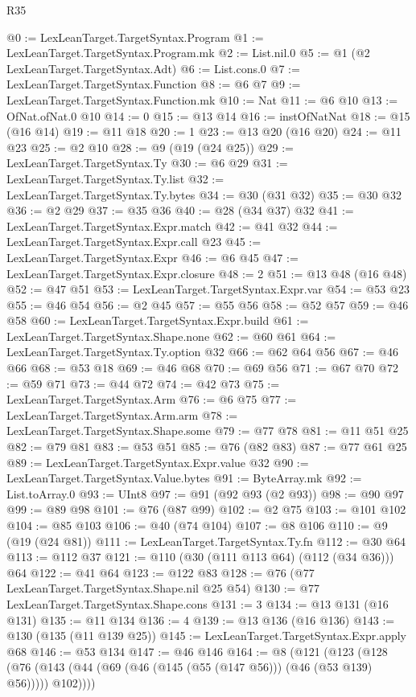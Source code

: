 \begin{lexlean}{R35}
\begin{coremodule}
@0 := LexLeanTarget.TargetSyntax.Program
@1 := LexLeanTarget.TargetSyntax.Program.mk
@2 := List.nil.{0}
@5 := @1 (@2 LexLeanTarget.TargetSyntax.Adt)
@6 := List.cons.{0}
@7 := LexLeanTarget.TargetSyntax.Function
@8 := @6 @7
@9 := LexLeanTarget.TargetSyntax.Function.mk
@10 := Nat
@11 := @6 @10
@13 := OfNat.ofNat.{0} @10
@14 := 0
@15 := @13 @14
@16 := instOfNatNat
@18 := @15 (@16 @14)
@19 := @11 @18
@20 := 1
@23 := @13 @20 (@16 @20)
@24 := @11 @23
@25 := @2 @10
@28 := @9 (@19 (@24 @25))
@29 := LexLeanTarget.TargetSyntax.Ty
@30 := @6 @29
@31 := LexLeanTarget.TargetSyntax.Ty.list
@32 := LexLeanTarget.TargetSyntax.Ty.bytes
@34 := @30 (@31 @32)
@35 := @30 @32
@36 := @2 @29
@37 := @35 @36
@40 := @28 (@34 @37) @32
@41 := LexLeanTarget.TargetSyntax.Expr.match
@42 := @41 @32
@44 := LexLeanTarget.TargetSyntax.Expr.call @23
@45 := LexLeanTarget.TargetSyntax.Expr
@46 := @6 @45
@47 := LexLeanTarget.TargetSyntax.Expr.closure
@48 := 2
@51 := @13 @48 (@16 @48)
@52 := @47 @51
@53 := LexLeanTarget.TargetSyntax.Expr.var
@54 := @53 @23
@55 := @46 @54
@56 := @2 @45
@57 := @55 @56
@58 := @52 @57
@59 := @46 @58
@60 := LexLeanTarget.TargetSyntax.Expr.build
@61 := LexLeanTarget.TargetSyntax.Shape.none
@62 := @60 @61
@64 := LexLeanTarget.TargetSyntax.Ty.option @32
@66 := @62 @64 @56
@67 := @46 @66
@68 := @53 @18
@69 := @46 @68
@70 := @69 @56
@71 := @67 @70
@72 := @59 @71
@73 := @44 @72
@74 := @42 @73
@75 := LexLeanTarget.TargetSyntax.Arm
@76 := @6 @75
@77 := LexLeanTarget.TargetSyntax.Arm.arm
@78 := LexLeanTarget.TargetSyntax.Shape.some
@79 := @77 @78
@81 := @11 @51 @25
@82 := @79 @81
@83 := @53 @51
@85 := @76 (@82 @83)
@87 := @77 @61 @25
@89 := LexLeanTarget.TargetSyntax.Expr.value @32
@90 := LexLeanTarget.TargetSyntax.Value.bytes
@91 := ByteArray.mk
@92 := List.toArray.{0}
@93 := UInt8
@97 := @91 (@92 @93 (@2 @93))
@98 := @90 @97
@99 := @89 @98
@101 := @76 (@87 @99)
@102 := @2 @75
@103 := @101 @102
@104 := @85 @103
@106 := @40 (@74 @104)
@107 := @8 @106
@110 := @9 (@19 (@24 @81))
@111 := LexLeanTarget.TargetSyntax.Ty.fn
@112 := @30 @64
@113 := @112 @37
@121 := @110 (@30 (@111 @113 @64) (@112 (@34 @36))) @64
@122 := @41 @64
@123 := @122 @83
@128 := @76 (@77 LexLeanTarget.TargetSyntax.Shape.nil @25 @54)
@130 := @77 LexLeanTarget.TargetSyntax.Shape.cons
@131 := 3
@134 := @13 @131 (@16 @131)
@135 := @11 @134
@136 := 4
@139 := @13 @136 (@16 @136)
@143 := @130 (@135 (@11 @139 @25))
@145 := LexLeanTarget.TargetSyntax.Expr.apply @68
@146 := @53 @134
@147 := @46 @146
@164 := @8
    (@121
      (@123
        (@128 (@76 (@143 (@44 (@69 (@46 (@145 (@55 (@147 @56))) (@46 (@53 @139) @56))))) @102))))

\end{coremodule}
\end{lexlean}
